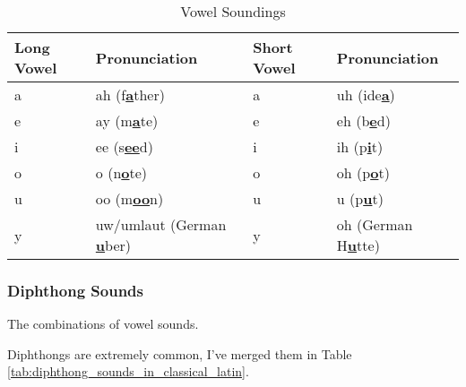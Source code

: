 \begin{table}[H]
	\centering

	\begin{tabular}{|l|l|l|l|}
		\hline
		\textbf{Long Vowel} & \textbf{Pronunciation}                       & \textbf{Short Vowel} & \textbf{Pronunciation}                 \\
		\hline
		a                   & ah (f\textbf{\underline{a}}ther)             & a                    & uh (ide\textbf{\underline{a}})         \\
		e                   & ay (m\textbf{\underline{a}}te)               & e                    & eh (b\textbf{\underline{e}}d)          \\
		i                   & ee (s\textbf{\underline{ee}}d)               & i                    & ih (p\textbf{\underline{i}}t)          \\
		o                   & o (n\textbf{\underline{o}}te)                & o                    & oh (p\textbf{\underline{o}}t)          \\
		u                   & oo (m\textbf{\underline{oo}}n)               & u                    & u (p\textbf{\underline{u}}t)           \\
		y                   & uw/umlaut (German \textbf{\underline{u}}ber) & y                    & oh (German H\textbf{\underline{u}}tte) \\
		\hline
	\end{tabular}

	\caption{Vowel Soundings}
	\label{tab:vowel_soundings}
\end{table}


\subsubsection{Diphthong Sounds}
\label{sub_sub_sec:diphthong_sounds}

\begin{definition}[Diphthongs]
	\label{def:diphthongs}

	The combinations of vowel sounds.
\end{definition}

Diphthongs are extremely common, I've merged them in Table
\ref{tab:diphthong_sounds_in_classical_latin}.

